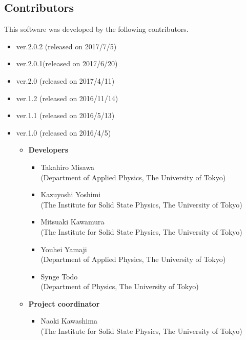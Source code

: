 \subsection{Contributors}
\label{subsec:contributors}
This software was developed by the following contributors.
\begin{itemize}
\item{ver.2.0.2 (released on 2017/7/5)}
\item{ver.2.0.1(released on 2017/6/20)}
\item{ver.2.0 (released on 2017/4/11)}
\item{ver.1.2 (released on 2016/11/14)}
\item{ver.1.1 (released on 2016/5/13)}
\item{ver.1.0 (released on 2016/4/5)}
\begin{itemize}
	\item{\bf Developers}
	\begin{itemize}
	\item{Takahiro Misawa \\(Department of Applied Physics, The University of Tokyo)}
	\item{Kazuyoshi Yoshimi\\ (The Institute for Solid State Physics, The University of Tokyo)}
	\item{Mitsuaki Kawamura\\ (The Institute for Solid State Physics, The University of Tokyo)}
	\item{Youhei Yamaji\\ (Department of Applied Physics, The University of Tokyo)}
	\item{Synge Todo\\ (Department of Physics, The University of Tokyo)}
	\end{itemize}
	\item{\bf Project coordinator}
	\begin{itemize}
	\item{Naoki Kawashima\\ (The Institute for Solid State Physics, The University of Tokyo)}
	\end{itemize}
\end{itemize}


\end{itemize}
